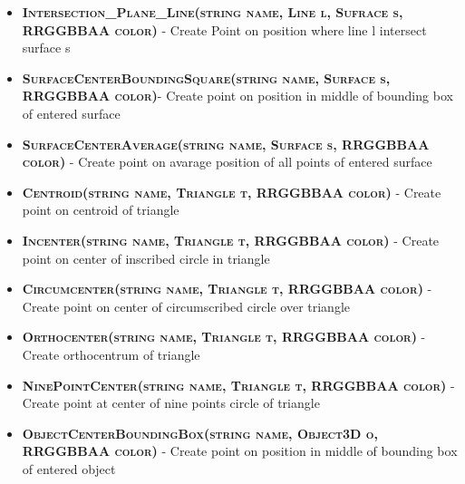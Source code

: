 \begin{itemize}
\item \textsc{\textbf{Intersection\_Plane\_Line(string name, Line l, Sufrace s, RRGGBBAA color)}} - Create Point on position where line l intersect surface s


\item \textsc{\textbf{SurfaceCenterBoundingSquare(string name, Surface s, RRGGBBAA color)}}- Create point on position in middle of bounding box of entered surface

\item \textsc{\textbf{SurfaceCenterAverage(string name, Surface s, RRGGBBAA color) }}- Create point on avarage position of all points of entered surface

\item \textsc{\textbf{Centroid(string name, Triangle t, RRGGBBAA color)}} - Create point on centroid of triangle

\item \textsc{\textbf{Incenter(string name, Triangle t, RRGGBBAA color)}} - Create point on center of inscribed circle in triangle

\item \textsc{\textbf{Circumcenter(string name, Triangle t, RRGGBBAA color) }}- Create point on center of circumscribed circle over triangle

\item \textsc{\textbf{Orthocenter(string name, Triangle t, RRGGBBAA color)}} - Create orthocentrum of triangle

\item \textsc{\textbf{NinePointCenter(string name, Triangle t, RRGGBBAA color)}} - Create point at center of nine points circle of triangle

\item \textsc{\textbf{ObjectCenterBoundingBox(string name, Object3D o, RRGGBBAA color)}} - Create point on position in middle of bounding box of entered object


\end{itemize}
